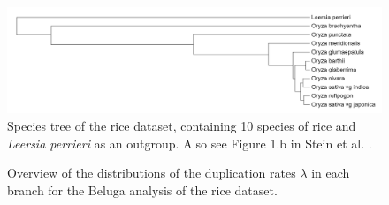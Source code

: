 \begin{figure}
	\centering
	\includegraphics[width=6.5in]{images/trees/rice-species-tree.png}
	\caption[Species tree of rice dataset]{Species tree of the rice dataset, containing 10 species of rice and \textit{Leersia perrieri} as an outgroup. Also see Figure 1.b in Stein et al. \parencite{rice}.}
    \label{fig:rice-tree}
\end{figure}

\begin{figure}
    \noindent{}
	\caption[Rice Beluga duplication rates]{Overview of the distributions of the duplication rates $\lambda$ in each branch for the Beluga analysis of the rice dataset.}
    \label{fig:rice-lambda}
\end{figure}

